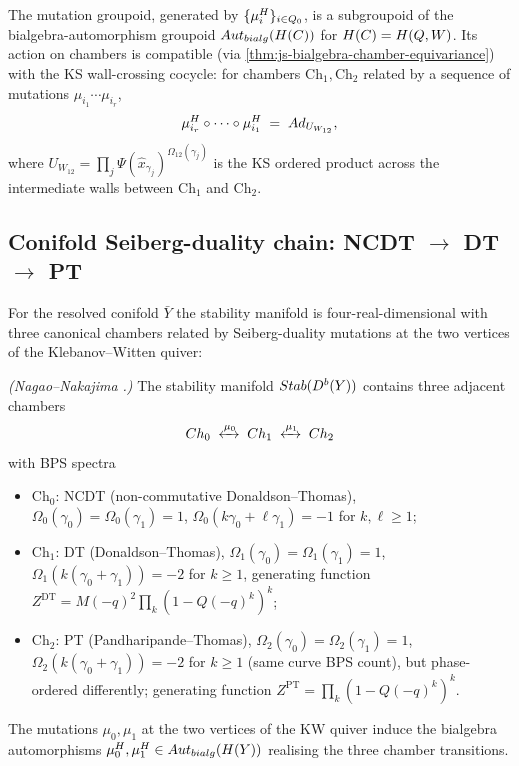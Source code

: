 \begin{corollary}
  \label{cor:mutation-in-aut-bialg}
  The mutation groupoid, generated by $\{\mu_i^\cH\}_{i \in Q_0}$, is a
  subgroupoid of the bialgebra-automorphism groupoid
  $\Aut_{\mathrm{bialg}}(\cH(\cC))$ for $\cH(\cC) = \cH(Q, W)$. Its action
  on chambers is compatible (via
  \cref{thm:js-bialgebra-chamber-equivariance}) with the KS wall-crossing
  cocycle: for chambers $\mathrm{Ch}_1, \mathrm{Ch}_2$ related by a sequence of
  mutations $\mu_{i_1} \cdots \mu_{i_r}$,
  \[
    \mu_{i_r}^\cH \circ \cdots \circ \mu_{i_1}^\cH
    \;=\; \mathrm{Ad}_{U_{W_{12}}},
  \]
  where $U_{W_{12}} = \prod_j \Psi(\hat{x}_{\gamma_j})^{\Omega_{12}(\gamma_j)}$
  is the KS ordered product across the intermediate walls between
  $\mathrm{Ch}_1$ and $\mathrm{Ch}_2$.
\end{corollary}

\subsection{Conifold Seiberg-duality chain: NCDT $\to$ DT $\to$ PT}
\label{subsec:conifold-seiberg-chain}

For the resolved conifold $\bar{Y}$ the stability manifold is
four-real-dimensional with three canonical chambers related by
Seiberg-duality mutations at the two vertices of the Klebanov--Witten
quiver:

\begin{theorem}
  \label{thm:conifold-seiberg-chain}
  \ClaimStatusTheorem \emph{(Nagao--Nakajima \cite{NagaoNakajima2011}.)}
  The stability manifold $\Stab(D^b(\bar{Y}))$ contains three adjacent
  chambers
  \[
    \mathrm{Ch}_0 \;\xleftrightarrow{\mu_0}\; \mathrm{Ch}_1 \;\xleftrightarrow{\mu_1}\; \mathrm{Ch}_2
  \]
  with BPS spectra
  \begin{itemize}[leftmargin=2em]
    \item $\mathrm{Ch}_0$: NCDT (non-commutative Donaldson--Thomas),
          $\Omega_0(\gamma_0) = \Omega_0(\gamma_1) = 1$,
          $\Omega_0(k\gamma_0 + \ell\gamma_1) = -1$ for $k, \ell \geq 1$;
    \item $\mathrm{Ch}_1$: DT (Donaldson--Thomas),
          $\Omega_1(\gamma_0) = \Omega_1(\gamma_1) = 1$,
          $\Omega_1(k(\gamma_0 + \gamma_1)) = -2$ for $k \geq 1$,
          generating function $Z^{\mathrm{DT}} = M(-q)^2 \prod_k (1 - Q(-q)^k)^k$;
    \item $\mathrm{Ch}_2$: PT (Pandharipande--Thomas),
          $\Omega_2(\gamma_0) = \Omega_2(\gamma_1) = 1$,
          $\Omega_2(k(\gamma_0 + \gamma_1)) = -2$ for $k \geq 1$ (same
          curve BPS count), but phase-ordered differently;
          generating function $Z^{\mathrm{PT}} = \prod_k (1 - Q(-q)^k)^k$.
  \end{itemize}
  The mutations $\mu_0, \mu_1$ at the two vertices of the KW quiver induce
  the bialgebra automorphisms $\mu_0^\cH, \mu_1^\cH \in
  \Aut_{\mathrm{bialg}}(\cH(\bar{Y}))$ realising the three chamber transitions.
\end{theorem}

